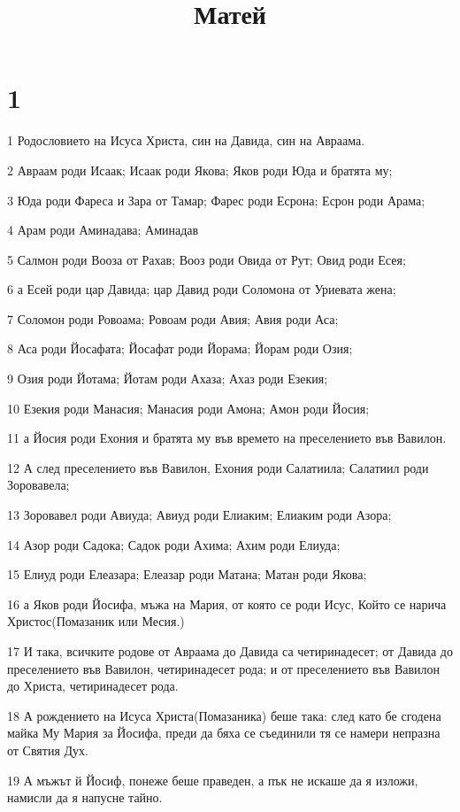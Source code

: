 

\title{Матей}


\chapter{1}

\par 1 Родословието на Исуса Христа, син на Давида, син на Авраама.
\par 2 Авраам роди Исаак; Исаак роди Якова; Яков роди Юда и братята му;
\par 3 Юда роди Фареса и Зара от Тамар; Фарес роди Есрона; Есрон роди Арама;
\par 4 Арам роди Аминадава; Аминадав
\par 5 Салмон роди Вооза от Рахав; Вооз роди Овида от Рут; Овид роди Есея;
\par 6 а Есей роди цар Давида; цар Давид роди Соломона от Уриевата жена;
\par 7 Соломон роди Ровоама; Ровоам роди Авия; Авия роди Аса;
\par 8 Аса роди Йосафата; Йосафат роди Йорама; Йорам роди Озия;
\par 9 Озия роди Йотама; Йотам роди Ахаза; Ахаз роди Езекия;
\par 10 Езекия роди Манасия; Манасия роди Амона; Амон роди Йосия;
\par 11 а Йосия роди Ехония и братята му във времето на преселението във Вавилон.
\par 12 А след преселението във Вавилон, Ехония роди Салатиила; Салатиил роди Зоровавела;
\par 13 Зоровавел роди Авиуда; Авиуд роди Елиаким; Елиаким роди Азора;
\par 14 Азор роди Садока; Садок роди Ахима; Ахим роди Елиуда;
\par 15 Елиуд роди Елеазара; Елеазар роди Матана; Матан роди Якова;
\par 16 а Яков роди Йосифа, мъжа на Мария, от която се роди Исус, Който се нарича Христос(Помазаник или Месия.)
\par 17 И така, всичките родове от Авраама до Давида са четиринадесет; от Давида до преселението във Вавилон, четиринадесет рода; и от преселението във Вавилон до Христа, четиринадесет рода.
\par 18 А рождението на Исуса Христа(Помазаника) беше така: след като бе сгодена майка Му Мария за Йосифа, преди да бяха се съединили тя се намери непразна от Святия Дух.
\par 19 А мъжът й Йосиф, понеже беше праведен, а пък не искаше да я изложи, намисли да я напусне тайно.
